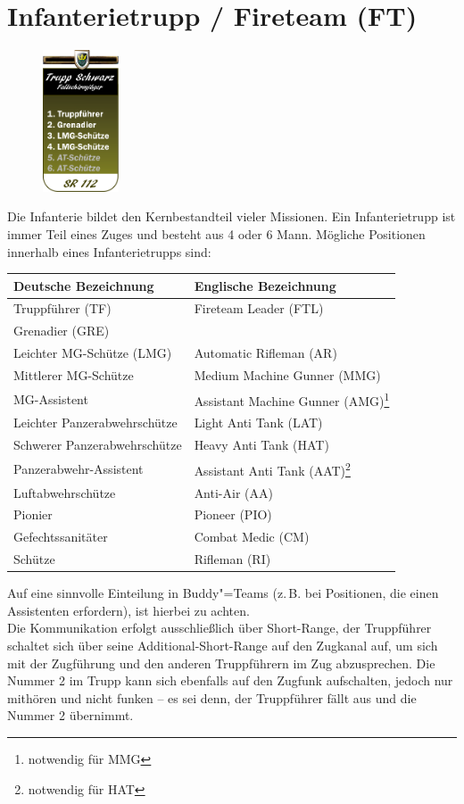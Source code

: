 \section{Infanterietrupp / Fireteam (FT)}
\begin{figure}
	\vspace{-50pt}
	\centering 
	\includegraphics[width=0.2\textwidth]{../img/truppenordnung/infanterie/infanterie}
	\vspace{-90pt}
\end{figure}
Die Infanterie bildet den Kernbestandteil vieler Missionen. Ein Infanterietrupp ist immer Teil eines Zuges und besteht aus 4 oder 6 Mann. Mögliche Positionen innerhalb eines Infanterietrupps sind:
\vspace{3.5cm}
\begin{longtable}{@{}P{0.4\textwidth}P{0.4\textwidth}@{}}
	\toprule
	Deutsche Bezeichnung & Englische Bezeichnung\\
	\midrule
	Truppführer (TF) & Fireteam Leader (FTL)\\
	Grenadier (GRE) & \\
	Leichter MG-Schütze (LMG) & Automatic Rifleman (AR)\\
	Mittlerer MG-Schütze & Medium Machine Gunner (MMG) \\
	MG-Assistent & Assistant Machine Gunner (AMG)\footnote{notwendig für MMG}\\ 
	Leichter Panzerabwehrschütze & Light Anti Tank (LAT)\\
	Schwerer Panzerabwehrschütze & Heavy Anti Tank (HAT)\\
	Panzerabwehr-Assistent & Assistant Anti Tank (AAT)\footnote{notwendig für HAT}\\ 
	Luftabwehrschütze & Anti-Air (AA)\\
	Pionier & Pioneer (PIO)\\
	Gefechtssanitäter & Combat Medic (CM)\\
	Schütze & Rifleman (RI)\\			
	\bottomrule					
\end{longtable}


Auf eine sinnvolle Einteilung in Buddy"=Teams (z.\,B. bei Positionen, die einen Assistenten erfordern), ist hierbei zu achten.\\
Die Kommunikation erfolgt ausschließlich über Short-Range, der Truppführer schaltet sich über seine Additional-Short-Range auf den Zugkanal auf, um sich mit der Zugführung und den anderen Truppführern im Zug abzusprechen. Die Nummer 2 im Trupp kann sich ebenfalls auf den Zugfunk aufschalten, jedoch nur mithören und nicht funken -- es sei denn, der Truppführer fällt aus und die Nummer 2 übernimmt.
